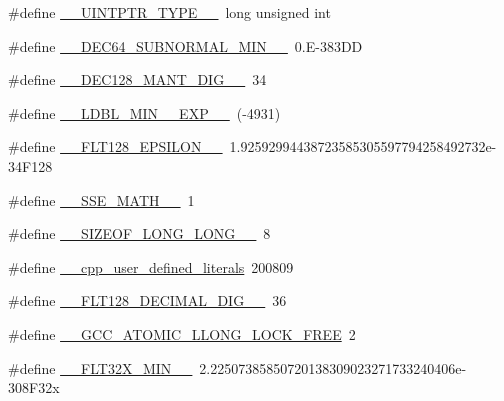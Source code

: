 \begin{DoxyCompactItemize}
\#define \hyperlink{cmake-build-debug_2babel__client__autogen_2moc__predefs_8h_a1c54273d3f148c51ad48fd738d1e6cbe}{\+\_\+\+\_\+\+U\+I\+N\+T\+P\+T\+R\+\_\+\+T\+Y\+P\+E\+\_\+\+\_\+}~long unsigned int
\item 
\#define \hyperlink{cmake-build-debug_2babel__client__autogen_2moc__predefs_8h_a6d3e36bb5d7e7ce3eda28fb174e404c6}{\+\_\+\+\_\+\+D\+E\+C64\+\_\+\+S\+U\+B\+N\+O\+R\+M\+A\+L\+\_\+\+M\+I\+N\+\_\+\+\_\+}~0.\+E-\/383\+DD
\item 
\#define \hyperlink{cmake-build-debug_2babel__client__autogen_2moc__predefs_8h_adeff56b51aead6443852cacac294d464}{\+\_\+\+\_\+\+D\+E\+C128\+\_\+\+M\+A\+N\+T\+\_\+\+D\+I\+G\+\_\+\+\_\+}~34
\item 
\#define \hyperlink{cmake-build-debug_2babel__client__autogen_2moc__predefs_8h_aa0d249d82751bd4ee0280990bc510371}{\+\_\+\+\_\+\+L\+D\+B\+L\+\_\+\+M\+I\+N\+\_\+\_\+\+E\+X\+P\+\_\+\+\_\+}~(-\/4931)
\item 
\#define \hyperlink{cmake-build-debug_2babel__client__autogen_2moc__predefs_8h_aa9e067f885a7396c1427d1547a89e063}{\+\_\+\+\_\+\+F\+L\+T128\+\_\+\+E\+P\+S\+I\+L\+O\+N\+\_\+\+\_\+}~1.\+92592994438723585305597794258492732e-\/34\+F128
\item 
\#define \hyperlink{cmake-build-debug_2babel__client__autogen_2moc__predefs_8h_ad378f6ccbd0d54016bda020b78adbbcb}{\+\_\+\+\_\+\+S\+S\+E\+\_\+\+M\+A\+T\+H\+\_\+\+\_\+}~1
\item 
\#define \hyperlink{cmake-build-debug_2babel__client__autogen_2moc__predefs_8h_a68e0683c8f359f7d7e013706fbcc2040}{\+\_\+\+\_\+\+S\+I\+Z\+E\+O\+F\+\_\+\+L\+O\+N\+G\+\_\+\+L\+O\+N\+G\+\_\+\+\_\+}~8
\item 
\#define \hyperlink{cmake-build-debug_2babel__client__autogen_2moc__predefs_8h_a05f3b9f6f2309a16af9d6fd939d97493}{\+\_\+\+\_\+cpp\+\_\+user\+\_\+defined\+\_\+literals}~200809
\item 
\#define \hyperlink{cmake-build-debug_2babel__client__autogen_2moc__predefs_8h_aeb0c11e60790bb1f2230e10b9fcc096f}{\+\_\+\+\_\+\+F\+L\+T128\+\_\+\+D\+E\+C\+I\+M\+A\+L\+\_\+\+D\+I\+G\+\_\+\+\_\+}~36
\item 
\#define \hyperlink{cmake-build-debug_2babel__client__autogen_2moc__predefs_8h_afb3458ec122d5fb5304b68bc48184e4e}{\+\_\+\+\_\+\+G\+C\+C\+\_\+\+A\+T\+O\+M\+I\+C\+\_\+\+L\+L\+O\+N\+G\+\_\+\+L\+O\+C\+K\+\_\+\+F\+R\+EE}~2
\item 
\#define \hyperlink{cmake-build-debug_2babel__client__autogen_2moc__predefs_8h_a3b9ca6d1bbc15a54595e781e4f24b045}{\+\_\+\+\_\+\+F\+L\+T32\+X\+\_\+\+M\+I\+N\+\_\+\+\_\+}~2.\+22507385850720138309023271733240406e-\/308\+F32x

\end{DoxyCompactItemize}
